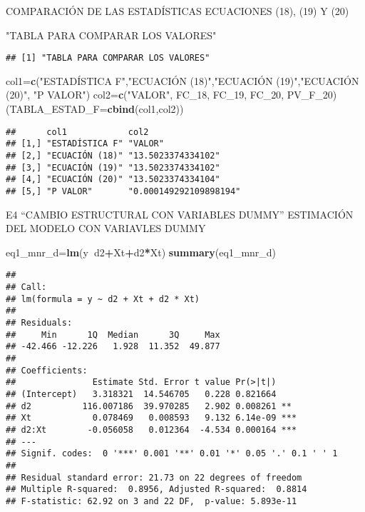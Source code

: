 \documentclass[
]{article}
\newenvironment{Shaded}{\begin{snugshade}}{\end{snugshade}}
\newcommand{\DataTypeTok}[1]{\textcolor[rgb]{0.13,0.29,0.53}{#1}}
\newcommand{\DecValTok}[1]{\textcolor[rgb]{0.00,0.00,0.81}{#1}}
\newcommand{\KeywordTok}[1]{\textcolor[rgb]{0.13,0.29,0.53}{\textbf{#1}}}
\newcommand{\NormalTok}[1]{#1}
\newcommand{\OperatorTok}[1]{\textcolor[rgb]{0.81,0.36,0.00}{\textbf{#1}}}
\newcommand{\StringTok}[1]{\textcolor[rgb]{0.31,0.60,0.02}{#1}}
\begin{document}
COMPARACIÓN DE LAS ESTADÍSTICAS ECUACIONES (18), (19) Y (20)

\begin{Shaded}
\begin{Highlighting}[]
\StringTok{"TABLA PARA COMPARAR LOS VALORES"}
\end{Highlighting}
\end{Shaded}

\begin{verbatim}
## [1] "TABLA PARA COMPARAR LOS VALORES"
\end{verbatim}

\begin{Shaded}
\begin{Highlighting}[]
\NormalTok{col1=}\KeywordTok{c}\NormalTok{(}\StringTok{"ESTADÍSTICA F"}\NormalTok{,}\StringTok{"ECUACIÓN (18)"}\NormalTok{,}\StringTok{"ECUACIÓN (19)"}\NormalTok{,}\StringTok{"ECUACIÓN (20)"}\NormalTok{, }\StringTok{"P VALOR"}\NormalTok{)}
\NormalTok{col2=}\KeywordTok{c}\NormalTok{(}\StringTok{"VALOR"}\NormalTok{, FC_}\DecValTok{18}\NormalTok{, FC_}\DecValTok{19}\NormalTok{, FC_}\DecValTok{20}\NormalTok{, PV_F_}\DecValTok{20}\NormalTok{)}
\NormalTok{(}\DataTypeTok{TABLA_ESTAD_F=}\KeywordTok{cbind}\NormalTok{(col1,col2))}
\end{Highlighting}
\end{Shaded}

\begin{verbatim}
##      col1            col2                  
## [1,] "ESTADÍSTICA F" "VALOR"               
## [2,] "ECUACIÓN (18)" "13.5023374334102"    
## [3,] "ECUACIÓN (19)" "13.5023374334102"    
## [4,] "ECUACIÓN (20)" "13.5023374334104"    
## [5,] "P VALOR"       "0.000149292109898194"
\end{verbatim}

E4 ``CAMBIO ESTRUCTURAL CON VARIABLES DUMMY'' ESTIMACIÓN DEL MODELO CON
VARIAVLES DUMMY

\begin{Shaded}
\begin{Highlighting}[]
\NormalTok{eq1_mnr_d=}\KeywordTok{lm}\NormalTok{(y}\OperatorTok{~}\NormalTok{d2}\OperatorTok{+}\NormalTok{Xt}\OperatorTok{+}\NormalTok{d2}\OperatorTok{*}\NormalTok{Xt)}
\KeywordTok{summary}\NormalTok{(eq1_mnr_d)}
\end{Highlighting}
\end{Shaded}

\begin{verbatim}
## 
## Call:
## lm(formula = y ~ d2 + Xt + d2 * Xt)
## 
## Residuals:
##     Min      1Q  Median      3Q     Max 
## -42.466 -12.226   1.928  11.352  49.877 
## 
## Coefficients:
##               Estimate Std. Error t value Pr(>|t|)    
## (Intercept)   3.318321  14.546705   0.228 0.821664    
## d2          116.007186  39.970285   2.902 0.008261 ** 
## Xt            0.078469   0.008593   9.132 6.14e-09 ***
## d2:Xt        -0.056058   0.012364  -4.534 0.000164 ***
## ---
## Signif. codes:  0 '***' 0.001 '**' 0.01 '*' 0.05 '.' 0.1 ' ' 1
## 
## Residual standard error: 21.73 on 22 degrees of freedom
## Multiple R-squared:  0.8956, Adjusted R-squared:  0.8814 
## F-statistic: 62.92 on 3 and 22 DF,  p-value: 5.893e-11
\end{verbatim}
\end{document}
